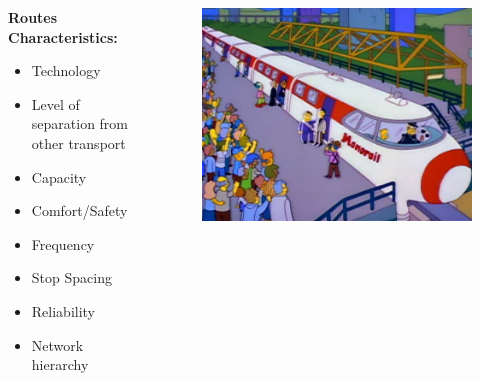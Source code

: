 \documentclass[aspectratio=169]{beamer}
\begin{document}
\begin{frame}
	
	
	
	\begin{columns}
		\begin{column}{0.5\textwidth}
			
			\textbf{Routes Characteristics:	}
			
			\vspace{2mm}
			\begin{itemize}
				\item Technology
				\item Level of separation from other transport
				\item Capacity
				\item Comfort/Safety
				\item Frequency
				\item Stop Spacing
				\item Reliability
				\item Network hierarchy
			\end{itemize}
			
			
		\end{column}
		
		\begin{column}{0.5\textwidth}
			\begin{figure}
				\centering
				\includegraphics[width=0.98\linewidth]{images/monorail.png}
			\end{figure}
			
		\end{column}
		
	\end{columns}
	

	
\end{frame}
\end{document}
